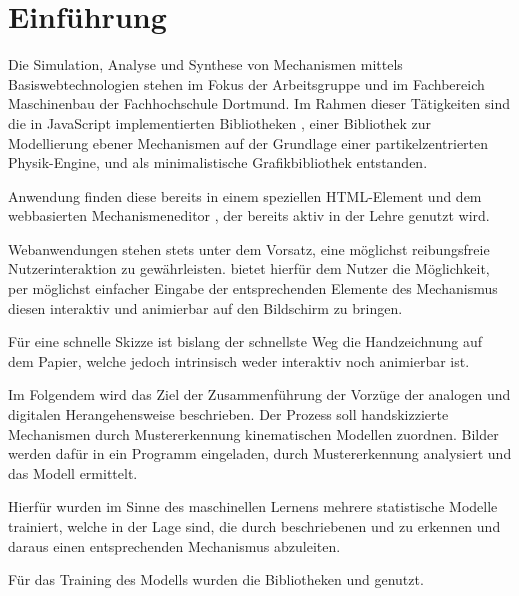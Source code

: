 \section{Einführung}
Die Simulation, Analyse und Synthese von Mechanismen mittels Basiswebtechnologien stehen im Fokus der Arbeitsgruppe  und  im Fachbereich Maschinenbau der Fachhochschule Dortmund.
Im Rahmen dieser Tätigkeiten sind die in JavaScript implementierten Bibliotheken  \cite{Goessner2019, Goessner2019a, Goessner2018}, einer Bibliothek zur Modellierung ebener Mechanismen auf der Grundlage einer partikelzentrierten Physik-Engine, und  \cite{Goessner2019b} als minimalistische Grafikbibliothek entstanden. 

Anwendung finden diese bereits in einem speziellen  HTML-Element und dem webbasierten Mechanismeneditor  \cite{Uhlig2019, Uhlig2019a}, der bereits aktiv in der Lehre genutzt wird.

Webanwendungen stehen stets unter dem Vorsatz, eine möglichst reibungsfreie Nutzerinteraktion zu gewährleisten.
 bietet hierfür dem Nutzer die Möglichkeit, per möglichst einfacher Eingabe der entsprechenden Elemente des Mechanismus diesen interaktiv und animierbar auf den Bildschirm zu bringen.

Für eine schnelle Skizze ist bislang der schnellste Weg die Handzeichnung auf dem Papier, welche jedoch intrinsisch weder interaktiv noch animierbar ist.

Im Folgendem wird das Ziel der Zusammenführung der Vorzüge der analogen und digitalen Herangehensweise beschrieben.
Der Prozess soll handskizzierte Mechanismen durch Mustererkennung kinematischen Modellen zuordnen. Bilder werden dafür in ein Programm eingeladen, durch Mustererkennung analysiert und das  Modell ermittelt.

Hierfür wurden im Sinne des maschinellen Lernens mehrere statistische Modelle trainiert, welche in der Lage sind, die durch  beschriebenen  und  zu erkennen und daraus einen entsprechenden Mechanismus abzuleiten.

Für das Training des Modells wurden die Bibliotheken  \cite{Google2019} und  \cite{Chollet2019, Chollet2017} genutzt.
